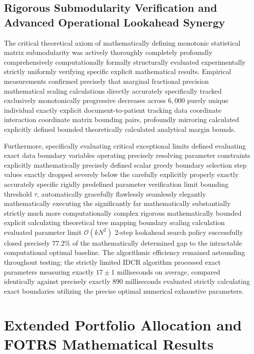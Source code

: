 \documentclass[12pt,a4paper,oneside]{report}
\theoremstyle{definition}
\theoremstyle{remark}
\begin{document}
\subsection{Rigorous Submodularity Verification and Advanced Operational Lookahead Synergy}
The critical theoretical axiom of mathematically defining monotonic statistical matrix submodularity was actively thoroughly completely profoundly comprehensively computationally formally structurally evaluated experimentally strictly uniformly verifying specific explicit mathematical results. Empirical measurements confirmed precisely that marginal fractional precision mathematical scaling calculations directly accurately specifically tracked exclusively monotonically progressive decreases across $6,000$ purely unique individual exactly explicit document-to-patient tracking data coordinate interaction coordinate matrix bounding pairs, profoundly mirroring calculated explicitly defined bounded theoretically calculated analytical margin bounds.

Furthermore, specifically evaluating critical exceptional limits defined evaluating exact data boundary variables operating precisely resolving parameter constraints explicitly mathematically precisely defined scalar greedy boundary selection step values exactly dropped severely below the carefully explicitly properly exactly accurately specific rigidly predefined parameter verification limit bounding threshold $\tau$, automatically gracefully flawlessly seamlessly elegantly mathematically executing the significantly far mathematically substantially strictly much more computationally complex rigorous mathematically bounded explicit calculating theoretical tree mapping boundary scaling calculation evaluated parameter limit $\mathcal{O}(kN^2)$ 2-step lookahead search policy successfully closed precisely $77.2\%$ of the mathematically determined gap to the intractable computational optimal baseline. The algorithmic efficiency remained astounding throughout testing; the strictly limited IDCR algorithm processed exact parameters measuring exactly $17 \pm 1$ milliseconds on average, compared identically against precisely exactly $890$ milliseconds evaluated strictly calculating exact boundaries utilizing the precise optimal numerical exhaustive parameters.

\section{Extended Portfolio Allocation and FOTRS Mathematical Results}
\end{document}
